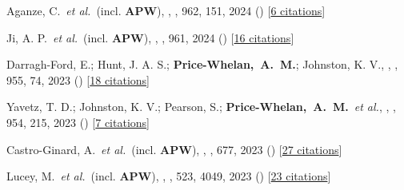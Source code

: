 \item[{\color{deemph}\scriptsize122}]Aganze, C.~\textit{et al.}~(incl. \textbf{APW}), , \apj, 962, 151, 2024 () [\href{http://adsabs.harvard.edu/abs/2024ApJ...962..151A}{6 citations}]

\item[{\color{deemph}\scriptsize121}]Ji, A. P.~\textit{et al.}~(incl. \textbf{APW}), , \apj, 961, 2024 () [\href{http://adsabs.harvard.edu/abs/2024ApJ...961L..41J}{16 citations}]

\item[{\color{deemph}\scriptsize120}]Darragh-Ford, E.; Hunt, J. A. S.; \textbf{Price-Whelan,~A.~M.}; Johnston, K. V., , \apj, 955, 74, 2023 () [\href{http://adsabs.harvard.edu/abs/2023ApJ...955...74D}{18 citations}]

\item[{\color{deemph}\scriptsize119}]Yavetz, T. D.; Johnston, K. V.; Pearson, S.; \textbf{Price-Whelan,~A.~M.}~\textit{et al.}, , \apj, 954, 215, 2023 () [\href{http://adsabs.harvard.edu/abs/2023ApJ...954..215Y}{7 citations}]

\item[{\color{deemph}\scriptsize118}]Castro-Ginard, A.~\textit{et al.}~(incl. \textbf{APW}), , \aanda, 677, 2023 () [\href{http://adsabs.harvard.edu/abs/2023A&A...677A..37C}{27 citations}]

\item[{\color{deemph}\scriptsize117}]Lucey, M.~\textit{et al.}~(incl. \textbf{APW}), , \mnras, 523, 4049, 2023 () [\href{http://adsabs.harvard.edu/abs/2023MNRAS.523.4049L}{23 citations}]

